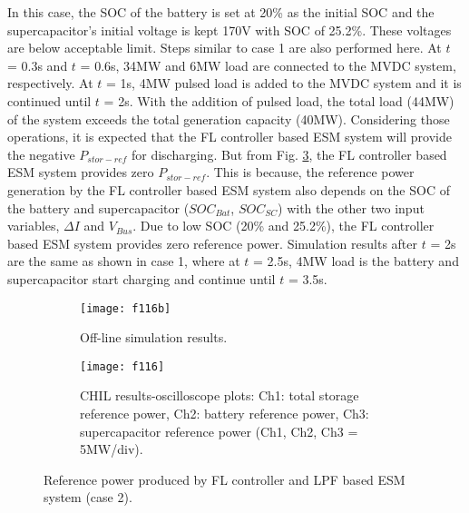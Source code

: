 In this case, the SOC of the battery is set at 20\% as the initial SOC and the supercapacitor’s initial voltage is kept 170V with SOC of 25.2\%. These voltages are below acceptable limit. Steps similar to case 1 are also performed here.  At $t$ = 0.3s and $t$ = 0.6s, 34MW and 6MW load are connected to the MVDC system, respectively. At $t$ = 1s, 4MW pulsed load is added to the MVDC system and it is continued until $t$ = 2s. With the addition of pulsed load, the total load (44MW) of the system exceeds the total generation capacity (40MW). Considering those operations, it is expected that the FL controller based ESM system will provide the negative $P_{stor-ref}$ for discharging. But from Fig. \ref{ch5_f116}, the FL controller based ESM system provides zero $P_{stor-ref}$. This is because, the reference power generation by the FL controller based ESM system also depends on the SOC of the battery and supercapacitor ($SOC_{Bat}$, $SOC_{SC}$) with the other two input variables, $\Delta I$ and $V_{Bus}$. Due to low SOC (20\% and 25.2\%),  the FL controller based ESM system provides zero reference power. Simulation results after $t$ = 2s are the same as shown in case 1, where at $t$ = 2.5s, 4MW load is the battery and supercapacitor start charging and continue until $t$ = 3.5s.
\begin{figure}[ht!]
\begin{subfigure}{1\columnwidth}
\begin{center}
\texttt{[image: f116b]}
\end{center}
\caption{Off-line simulation results.}
\label{ch5_f116b}
\end{subfigure}
\begin{subfigure}{1\columnwidth}
\begin{center}
\texttt{[image: f116]}
\end{center}
\caption{CHIL results-oscilloscope plots: Ch1: total storage reference power, Ch2: battery reference power, Ch3: supercapacitor reference  power (Ch1, Ch2, Ch3 = 5MW/div).}
\label{ch5_f116a}
\end{subfigure}
\caption{Reference power produced by FL controller and LPF based ESM system (case 2).}
\label{ch5_f116}
\end{figure}

